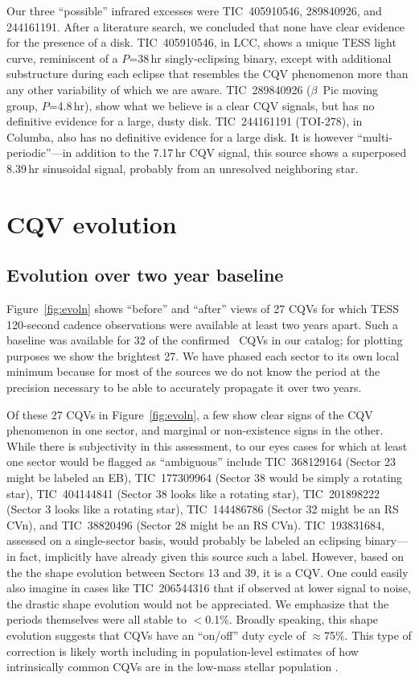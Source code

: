 \documentclass[11pt,twocolumn,tighten]{aastex63}
\begin{document}
Our three ``possible'' infrared excesses were TIC~405910546,
289840926, and 244161191.  After a literature search, we concluded
that none have clear evidence for the presence of a disk.
TIC~405910546, in LCC, shows a unique TESS light curve, reminiscent of
a $P$=38\,hr singly-eclipsing binary, except with additional
substructure during each eclipse that resembles the CQV phenomenon
more than any other variability of which we are aware.  TIC~289840926
($\beta$~Pic moving group, $P$=4.8\,hr), show what we believe is a
clear CQV signals, but has no definitive evidence for a large, dusty
disk.  TIC~244161191 (TOI-278), in Columba, also has no
definitive evidence for a large disk.  It is however
``multi-periodic''---in addition to the 7.17\,hr CQV signal, this
source shows a superposed 8.39\,hr sinusoidal signal, probably from an
unresolved neighboring star.


\section{CQV evolution}
\label{sec:evoln}

\subsection{Evolution over two year baseline}

Figure~\ref{fig:evoln} shows ``before'' and ``after'' views of 27 CQVs
for which TESS 120-second cadence observations were available at least
two years apart.  Such a baseline was available for 32 of the
confirmed \ngoods\ CQVs in our catalog; for plotting purposes we show
the brightest 27.  
We have phased each sector to its own local minimum because for most of the
sources we do not know the period at the precision necessary to be able to
accurately propagate it over two years.

Of these 27 CQVs in Figure~\ref{fig:evoln}, a few show clear signs of the
CQV phenomenon in one sector, and marginal or non-existence signs in the
other.  While there is subjectivity in this assessment, to our
eyes cases for which at least one sector would be flagged as
``ambiguous'' include
TIC~368129164 (Sector 23 might be labeled an EB),
TIC~177309964 (Sector 38 would be simply a rotating star),
TIC~404144841 (Sector 38 looks like a rotating star),
TIC~201898222 (Sector 3 looks like a rotating star),
TIC~144486786 (Sector 32 might be an RS CVn),
and
TIC~38820496 (Sector 28 might be an RS CVn).
TIC~193831684, assessed on a single-sector basis, would probably be
labeled an eclipsing binary---in fact, \citet{2021ApJ...912..123J}
implicitly have already given this source such a label.  However,
based on the the shape evolution between Sectors 13 and 39, it is a
CQV.  One could easily also imagine in cases like TIC~206544316 that
if observed at lower signal to noise, the drastic shape evolution
would not be appreciated.  We emphasize that the periods themselves
were all stable to $<$0.1\%.  Broadly speaking, this shape evolution
suggests that CQVs have an ``on/off'' duty cycle of $\approx$75\%.
This type of correction is likely worth including in population-level
estimates of how intrinsically common CQVs are in the low-mass stellar
population \citep[e.g.][]{2022AJ....163..144G}.
\end{document}
